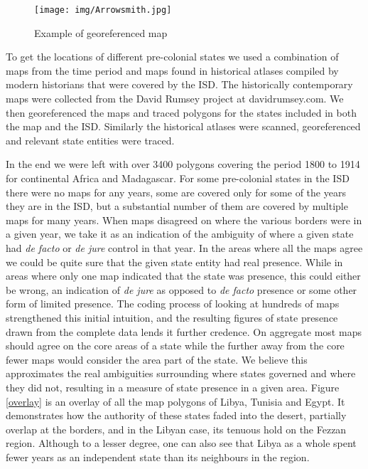 \documentclass[12pt]{article}
\begin{document}
\begin{figure}[htpb]
	\centering
	\texttt{[image: img/Arrowsmith.jpg]}
	\caption{Example of georeferenced map}%
	\label{fig:Arrowsmith}
\end{figure}

\begin{multicols}{2}

To get the locations of different pre-colonial states we used a combination of
maps from the time period and maps found in historical atlases compiled by
modern historians that were covered by the ISD. The historically contemporary
maps were collected from the David Rumsey project at davidrumsey.com. We then
georeferenced the maps and traced polygons for the states included in both the
map and the ISD. Similarly the historical atlases were scanned, georeferenced
and relevant state entities were traced.

In the end we were left with over 3400 polygons covering the period 1800 to 1914
for continental Africa and Madagascar. For some pre-colonial states in the ISD
there were no maps for any years, some are covered only for some of the years
they are in the ISD, but a substantial number of them are covered by multiple
maps for many years. When maps disagreed on where the various borders were in a
given year, we take it as an indication of the ambiguity of where a given state
had \emph{de facto} or \emph{de jure} control in that year. In the areas where
all the maps agree we could be quite sure that the given state entity had real
presence.  While in areas where only one map indicated that the state was
presence, this could either be wrong, an indication of \emph{de jure} as opposed
to \emph{de facto} presence or some other form of limited presence. The coding
process of looking at hundreds of maps strengthened this initial intuition, and
the resulting figures of state presence drawn from the complete data lends it
further credence. On aggregate most maps should agree on the core areas of a
state while the further away from the core fewer maps would consider the area
part of the state. We believe this approximates the real ambiguities surrounding
where states governed and where they did not, resulting in a measure of state
presence in a given area. Figure \ref{overlay} is an overlay of all the map
polygons of Libya, Tunisia and Egypt. It demonstrates how the authority of these
states faded into the desert, partially overlap at the borders, and in the
Libyan case, its tenuous hold on the Fezzan region. Although to a lesser degree,
one can also see that Libya as a whole spent fewer years as an independent state
than its neighbours in the region.

\end{multicols}
\end{document}
